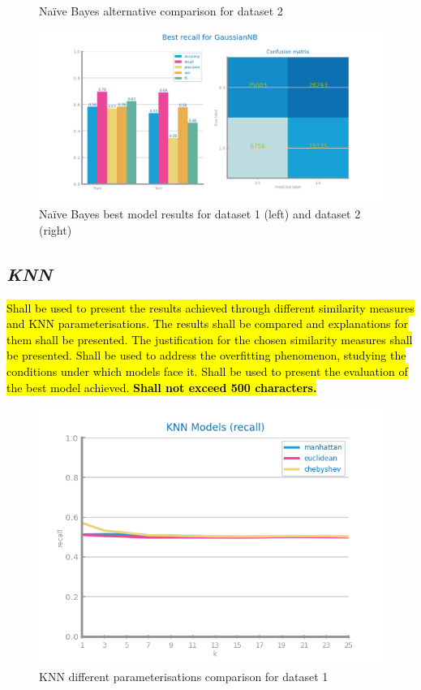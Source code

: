 \documentclass[10pt]{extarticle}
\newcommand{\ctext}[3][RGB]{%
  \begingroup
  \definecolor{hlcolor}{#1}{#2}\sethlcolor{hlcolor}%
  \hl{#3}%
  \endgroup
}
\begin{document}
\begin{figure}[H]
\caption{Na{\"i}ve Bayes alternative comparison for dataset 2}
\end{figure}

\begin{figure}[H]
\centering\includegraphics[scale=0.95]{images/dataset1/models_evaluation/CovidPos_GaussianNB_best_recall_eval.png}
\caption{Na{\"i}ve Bayes best model results for dataset 1 (left) and dataset 2 (right)}
\end{figure}

\subsection*{\textit{KNN}}
\ctext[RGB]{190,190,190}{Shall be used to present the results achieved through different similarity measures and KNN parameterisations. The results shall be compared and explanations for them shall be presented. The justification for the chosen similarity measures shall be presented. Shall be used to address the overfitting phenomenon, studying the conditions under which models face it. Shall be used to present the evaluation of the best model achieved.  \textbf{Shall not exceed 500 characters.}}

\begin{figure}[H]
\centering\includegraphics[scale=0.95]{images/dataset1/models_evaluation/CovidPos_knn_recall_study.png}
\caption{KNN different parameterisations comparison for dataset 1}
\end{figure}
\end{document}
